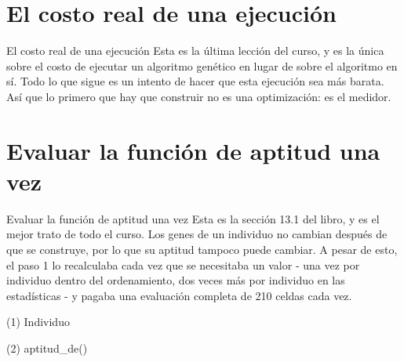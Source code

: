 \section{El costo real de una ejecución}

\begin{frame}{El costo real de una ejecución}
Esta es la última lección del curso, y es la única sobre el costo de
ejecutar un algoritmo genético en lugar de sobre el algoritmo en sí. Todo lo
que sigue es un intento de hacer que esta ejecución sea más barata. Así que lo primero que hay que construir
no es una optimización: es el medidor.
\end{frame}


\section{Evaluar la función de aptitud una vez}

\begin{frame}{Evaluar la función de aptitud una vez}
Esta es la sección 13.1 del libro, y es el mejor trato de todo el curso.
Los genes de un individuo no cambian después de que se construye, por lo que su aptitud tampoco puede
cambiar. A pesar de esto, el paso 1 lo recalculaba cada vez que se necesitaba un valor
- una vez por individuo dentro del ordenamiento, dos veces más por individuo en las
estadísticas - y pagaba una evaluación completa de 210 celdas cada vez.
\end{frame}

\begin{frame}[fragile]{(1) Individuo}

\end{frame}

\begin{frame}[fragile]{(2) aptitud\_de()}

\end{frame}

